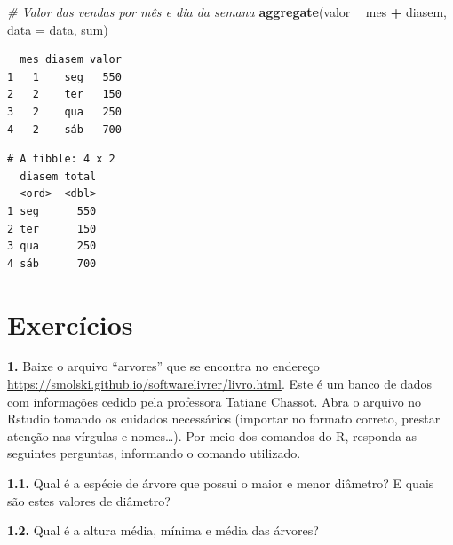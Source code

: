 \documentclass[12pt,brazil,oneside]{book}
\newenvironment{Shaded}{\begin{snugshade}}{\end{snugshade}}
\newcommand{\CommentTok}[1]{\textcolor[rgb]{0.56,0.35,0.01}{\textit{#1}}}
\newcommand{\DataTypeTok}[1]{\textcolor[rgb]{0.13,0.29,0.53}{#1}}
\newcommand{\KeywordTok}[1]{\textcolor[rgb]{0.13,0.29,0.53}{\textbf{#1}}}
\newcommand{\NormalTok}[1]{#1}
\newcommand{\OperatorTok}[1]{\textcolor[rgb]{0.81,0.36,0.00}{\textbf{#1}}}
\newcommand{\StringTok}[1]{\textcolor[rgb]{0.31,0.60,0.02}{#1}}
\begin{document}
\begin{Shaded}
\begin{Highlighting}[]
\CommentTok{# Valor das vendas por mês e dia da semana }
\KeywordTok{aggregate}\NormalTok{(valor }\OperatorTok{~}\StringTok{ }\NormalTok{mes }\OperatorTok{+}\StringTok{ }\NormalTok{diasem, }\DataTypeTok{data =}\NormalTok{ data, sum)}
\end{Highlighting}
\end{Shaded}

\begin{verbatim}
  mes diasem valor
1   1    seg   550
2   2    ter   150
3   2    qua   250
4   2    sáb   700
\end{verbatim}

\begin{Shaded}
\end{Shaded}

\begin{verbatim}
# A tibble: 4 x 2
  diasem total
  <ord>  <dbl>
1 seg      550
2 ter      150
3 qua      250
4 sáb      700
\end{verbatim}

\hypertarget{exercicios}{%
\section{Exercícios}\label{exercicios}}

\textbf{1.} Baixe o arquivo ``arvores'' que se encontra no endereço \url{https://smolski.github.io/softwarelivrer/livro.html}. Este é um banco de dados com informações cedido pela professora Tatiane Chassot. Abra o arquivo no Rstudio tomando os cuidados necessários (importar no formato correto, prestar atenção nas vírgulas e nomes\ldots{}). Por meio dos comandos do R, responda as seguintes perguntas, informando o comando utilizado.

\textbf{1.1.} Qual é a espécie de árvore que possui o maior e menor diâmetro? E quais são estes valores de diâmetro?

\textbf{1.2.} Qual é a altura média, mínima e média das árvores?
\end{document}
